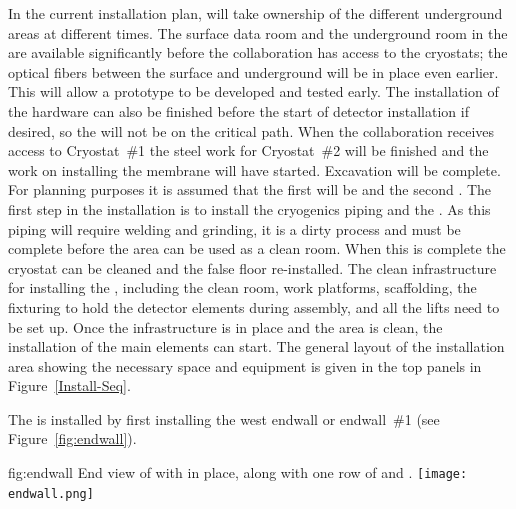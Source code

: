 In the current installation plan,  will take
ownership of the different underground areas at different times. The
surface data room and the underground room in the  are available
significantly before the collaboration has access to the cryostats; 
the optical fibers between the surface and underground will be in
place even earlier. This will allow a  prototype to be developed
and tested early. The installation of the  hardware can also be
finished before the start of detector installation if desired, so the
 will not be on the critical path.  When the collaboration receives
access to Cryostat~\#1 the steel work for Cryostat~\#2 will be
finished and the work on installing the membrane will have
started. Excavation will be complete.  For planning purposes it is
assumed that the first  will be  and the second
. The first step in the  installation is to
install the cryogenics piping and the . As this piping will
require welding and grinding, it is a dirty process and must be
complete before the area can be used as a clean room. When this is
complete the cryostat can be cleaned and the false floor
re-installed. The clean infrastructure for installing the ,
including the clean room, work platforms, scaffolding, the
fixturing to hold the detector elements during assembly, and all the
lifts need to be set up. Once the infrastructure is in place and the
area is clean, the installation of the main elements can start. The
general layout of the installation area showing the necessary space
and equipment is given in the top panels in Figure~\ref{Install-Seq}.

The   is installed by first installing the west endwall or
endwall~\#1 (see Figure~\ref{fig:endwall}).

\begin{dunefigure}{fig:endwall}
  {End view of  with  in
  place, along with one row of  and .}
\texttt{[image: endwall.png]}
\end{dunefigure}

